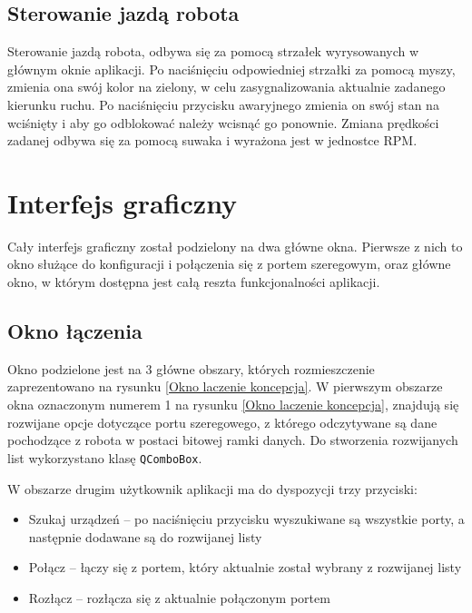 \subsection{Sterowanie jazdą robota}

Sterowanie jazdą robota, odbywa się za pomocą strzałek wyrysowanych w głównym oknie aplikacji. Po naciśnięciu odpowiedniej strzałki za pomocą myszy, zmienia ona swój kolor na zielony, w celu zasygnalizowania aktualnie zadanego kierunku ruchu. Po naciśnięciu przycisku awaryjnego zmienia on swój stan na wciśnięty i aby go odblokować należy wcisnąć go ponownie. Zmiana prędkości zadanej odbywa się za pomocą suwaka i wyrażona jest w jednostce RPM.          

\section{Interfejs graficzny}

Cały interfejs graficzny został podzielony na dwa główne okna. Pierwsze z nich to okno służące do konfiguracji i połączenia się z portem szeregowym, oraz główne okno, w którym dostępna jest całą reszta funkcjonalności aplikacji. 

\subsection{Okno łączenia}

Okno podzielone jest na 3 główne obszary, których rozmieszczenie zaprezentowano na rysunku \ref{Okno laczenie koncepcja}.
W pierwszym obszarze okna oznaczonym numerem 1 na rysunku \ref{Okno laczenie koncepcja}, znajdują się rozwijane opcje dotyczące portu szeregowego, z którego odczytywane są dane pochodzące z robota w postaci bitowej ramki danych. Do stworzenia rozwijanych list wykorzystano klasę \texttt{QComboBox}.

W obszarze drugim użytkownik aplikacji ma do dyspozycji trzy przyciski:
\begin{itemize}
    \item Szukaj urządzeń -- po naciśnięciu przycisku wyszukiwane są wszystkie porty, a następnie dodawane są do rozwijanej listy
    \item Połącz -- łączy się z portem, który aktualnie został wybrany z rozwijanej listy
    \item Rozłącz -- rozłącza się z aktualnie połączonym portem
\end{itemize}

